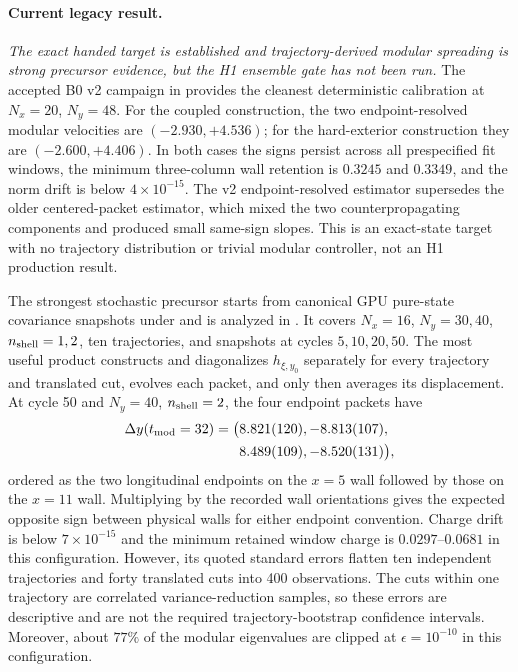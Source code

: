 \documentclass[aps,prx,twocolumn,floatfix,nofootinbib,superscriptaddress,longbibliography]{revtex4-2}
\begin{document}
\paragraph*{Current legacy result.}
\emph{The exact handed target is established and trajectory-derived modular spreading is
strong precursor evidence, but the H1 ensemble gate has not been run.}
The accepted B0 v2 campaign in
 provides the
cleanest deterministic calibration at $N_x=20$, $N_y=48$.  For the coupled construction,
the two endpoint-resolved modular velocities are $(-2.930,+4.536)$; for the hard-exterior
construction they are $(-2.600,+4.406)$.  In both cases the signs persist across all
prespecified fit windows, the minimum three-column wall retention is $0.3245$ and $0.3349$,
and the norm drift is below $4\times10^{-15}$.  The v2 endpoint-resolved estimator
supersedes the older centered-packet estimator, which mixed the two counterpropagating
components and produced small same-sign slopes.  This is an exact-state target with no
trajectory distribution or trivial modular controller, not an H1 production result.

The strongest stochastic precursor starts from canonical GPU pure-state covariance
snapshots under
 and is analyzed
in .
It covers $N_x=16$, $N_y=30,40$, $n_{\rm shell}=1,2$, ten trajectories, and snapshots at
cycles $5,10,20,50$.  The most useful product constructs and diagonalizes
$h_{\xi,y_0}$ separately for every trajectory and translated cut, evolves each packet, and
only then averages its displacement.  At cycle 50 and $N_y=40$, $n_{\rm shell}=2$, the
four endpoint packets have
\begin{equation}
 \begin{aligned}
 \Delta y(t_{\rm mod}=32)=\bigl(&8.821(120),-8.813(107),\\
                                  &8.489(109),-8.520(131)\bigr),
 \end{aligned}
\end{equation}
ordered as the two longitudinal endpoints on the $x=5$ wall followed by those on the
$x=11$ wall.  Multiplying by the recorded wall orientations gives the expected opposite
sign between physical walls for either endpoint convention.  Charge drift is below
$7\times10^{-15}$ and the minimum retained window charge is $0.0297$--$0.0681$ in this
configuration.  However, its quoted standard errors flatten ten independent trajectories
and forty translated cuts into 400 observations.  The cuts within one trajectory are
correlated variance-reduction samples, so these errors are descriptive and are not the
required trajectory-bootstrap confidence intervals.  Moreover, about $77\%$ of the
modular eigenvalues are clipped at $\epsilon=10^{-10}$ in this configuration.
\end{document}
